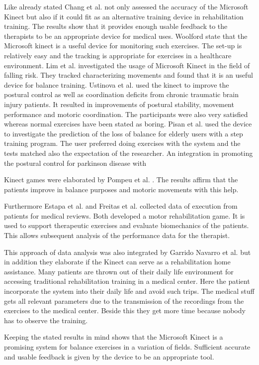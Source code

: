 Like already stated Chang et al. \cite{Chang2012-hz} not only assessed the accuracy of the Microsoft Kinect but also if it could fit as an alternative training device in rehabilitation training. The results show that it provides enough usable feedback to the therapists to be an appropriate device for medical uses. Woolford \cite{Woolford2015-ub} state that the Microsoft kinect is a useful device for monitoring such exercises. The set-up is relatively easy and the tracking is appropriate for exercises in a healthcare environment. Lim et al. \cite{Lim2015-pw} investigated the usage of Microsoft Kinect in the field of falling risk. They tracked characterizing movements and found that it is an useful device for balance training. Ustinova et al. \cite{Ustinova2014-ml} used the kinect to improve the postural control as well as coordination deficits from chronic traumatic brain injury patients. It resulted in improvements of postural stability, movement performance and motoric coordination. The participants were also very satisfied whereas normal exercises have been stated as boring. Pisan et al. \cite{Pisan2013-sf} used the device to investigate the prediction of the loss of balance for elderly users with a step training program. The user preferred doing exercises with the system and the tests matched also the expectation of the researcher. An integration in promoting the postural control for parkinson disease with 

Kinect games were elaborated by Pompeu et al. \cite{Pompeu2014-yl} \cite{Pompeu2015-vp}. The results affirm that the patients improve in balance purposes and motoric movements with this help.

Furthermore Estapa et al. \cite{Estepa2016-oj} and Freitas et al. \cite{Freitas2012-ae} collected data of execution from patients for medical reviews. Both developed a motor rehabilitation game. It is used to support therapeutic exercises and evaluate biomechanics of the patients. This allows subsequent analysis of the performance data for the therapist.

This approach of data analysis was also integrated by Garrido Navarro et al. \cite{Garrido2013-zs} but in addition they elaborate if the Kinect can serve as a rehabilitation home assistance. Many patients are thrown out of their daily life environment for accessing traditional rehabilitation training in a medical center. Here the patient incorporate the system into their daily life and avoid such trips. The medical stuff gets all relevant parameters due to the transmission of the recordings from the exercises to the medical center. Beside this they get more time because nobody has to observe the training.

Keeping the stated results in mind shows that the Microsoft Kinect is a promising system for balance exercises in a variation of fields. Sufficient accurate and usable feedback is given by the device to be an appropriate tool.
